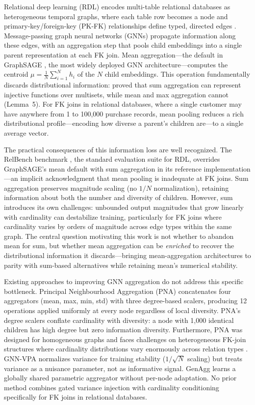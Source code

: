 \documentclass[11pt,letterpaper]{article}
\begin{document}
Relational deep learning (RDL) encodes multi-table relational databases as heterogeneous temporal graphs, where each table row becomes a node and primary-key/foreign-key (PK-FK) relationships define typed, directed edges \citep{Robinson2024, Fey2024}. Message-passing graph neural networks (GNNs) propagate information along these edges, with an aggregation step that pools child embeddings into a single parent representation at each FK join. Mean aggregation---the default in GraphSAGE \citep{Hamilton2017}, the most widely deployed GNN architecture---computes the centroid $\mu = \frac{1}{N}\sum_{i=1}^{N} h_i$ of the $N$ child embeddings. This operation fundamentally discards distributional information: \citet{Xu2019} proved that sum aggregation can represent injective functions over multisets, while mean and max aggregation cannot (Lemma~5). For FK joins in relational databases, where a single customer may have anywhere from 1 to 100,000 purchase records, mean pooling reduces a rich distributional profile---encoding how diverse a parent's children are---to a single average vector.

The practical consequences of this information loss are well recognized. The RelBench benchmark \citep{Robinson2024}, the standard evaluation suite for RDL, overrides GraphSAGE's mean default with sum aggregation in its reference implementation---an implicit acknowledgment that mean pooling is inadequate at FK joins. Sum aggregation preserves magnitude scaling (no $1/N$ normalization), retaining information about both the number and diversity of children. However, sum introduces its own challenges: unbounded output magnitudes that grow linearly with cardinality can destabilize training, particularly for FK joins where cardinality varies by orders of magnitude across edge types within the same graph. The central question motivating this work is not whether to abandon mean for sum, but whether mean aggregation can be \emph{enriched} to recover the distributional information it discards---bringing mean-aggregation architectures to parity with sum-based alternatives while retaining mean's numerical stability.

Existing approaches to improving GNN aggregation do not address this specific bottleneck. Principal Neighbourhood Aggregation (PNA) \citep{Corso2020} concatenates four aggregators (mean, max, min, std) with three degree-based scalers, producing 12 operations applied uniformly at every node regardless of local diversity. PNA's degree scalers conflate cardinality with diversity: a node with 1,000 identical children has high degree but zero information diversity. Furthermore, PNA was designed for homogeneous graphs and faces challenges on heterogeneous FK-join structures where cardinality distributions vary enormously across relation types \citep{Robinson2024}. GNN-VPA \citep{Schneckenreiter2024} normalizes variance for training stability ($1/\sqrt{N}$ scaling) but treats variance as a nuisance parameter, not as informative signal. GenAgg \citep{Kortvelesy2023} learns a globally shared parametric aggregator without per-node adaptation. No prior method combines gated variance injection with cardinality conditioning specifically for FK joins in relational databases.
\end{document}
